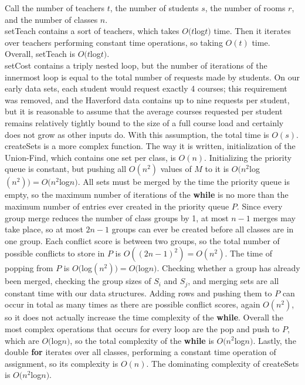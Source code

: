 \documentclass[11pt, oneside]{article}   	%
\begin{document}
Call the number of teachers $t$, the number of students $s$, the number of rooms $r$, and the number of classes $n$. \\

 setTeach contains a sort of teachers, which takes $O(t$log$t)$ time. Then it iterates over teachers performing constant time operations, so taking $O(t)$ time. Overall, setTeach is $O(t$log$t)$. \\

 setCost contains a triply nested loop, but the number of iterations of the innermost loop is equal to the total number of requests made by students. On our early data sets, each student would request exactly 4 courses; this requirement was removed, and the Haverford data contains up to nine requests per student, but it is reasonable to assume that the average courses requested per student remains relatively tightly bound to the size of a full course load and certainly does not grow as other inputs do. With this assumption, the total time is $O(s)$. \\

 createSets is a more complex function. The way it is written, initialization of the Union-Find, which contains one set per class, is $O(n)$. Initializing the priority queue is constant, but pushing all $O(n^2)$ values of $M$ to it is $O(n^2$log$(n^2)) = O(n^2$log$n)$. All sets must be merged by the time the priority queue is empty, so the maximum number of iterations of the \textbf{while} is no more than the maximum number of entries ever created in the priority queue $P$. Since every group merge reduces the number of class groups by 1, at most $n-1$ merges may take place, so at most $2n-1$ groups can ever be created before all classes are in one group. Each conflict score is between two groups, so the total number of possible conflicts to store in $P$ is $O((2n-1)^2) = O(n^2)$. The time of popping from $P$ is $O($log$(n^2)) = O($log$n)$. Checking whether a group has already been merged, checking the group sizes of $S_i$ and $S_j$, and merging sets are all constant time with our data structures. Adding rows and pushing them to $P$ can occur in total as many times as there are possible conflict scores, again $O(n^2)$, so it does not actually increase the time complexity of the \textbf{while}. Overall the most complex operations that occurs for every loop are the pop and push to $P$, which are $O($log$n)$, so the total complexity of the \textbf{while} is $O(n^2$log$n)$. Lastly, the double \textbf{for} iterates over all classes, performing a constant time operation of assignment, so its complexity is $O(n)$. The dominating complexity of createSets is $O(n^2$log$n)$. \\
 
\end{document}
